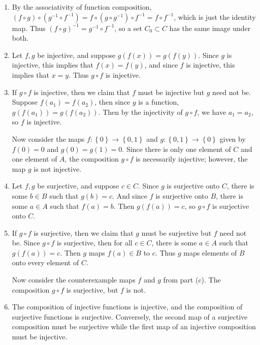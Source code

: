 \documentclass[11pt]{article}
\begin{document}
\begin{enumerate}
	\item By the associativity of function composition, $(f \circ g) \circ (g^{-1} \circ f^{-1}) = f \circ (g \circ g^{-1}) \circ f^{-1} = f \circ f^{-1}$, which is just the identity map. Thus $(f\circ g)^{-1} = g^{-1} \circ f^{-1}$, so a set $C_0 \subset C$ has the same image under both.
	
	\item Let $f,g$ be injective, and suppose $g(f(x)) = g(f(y))$. Since $g$ is injective, this implies that $f(x)=f(y)$, and since $f$ is injective, this implies that $x=y$. Thus $g \circ f$ is injective.

	\item If $g \circ f$ is injective, then we claim that $f$ must be injective but $g$ need not be. Suppose $f(a_1)=f(a_2)$, then since $g$ is a function, $g(f(a_1))=g(f(a_2))$. Then by the injectivity of $g \circ f$, we have $a_1=a_2$, so $f$ is injective.

		Now consider the maps $f:\left\{ 0 \right\}\to \left\{ 0,1 \right\}$ and $g:\left\{ 0,1 \right\}\to \left\{ 0 \right\}$ given by $f(0)=0$ and $g(0)=g(1)=0$. Since there is only one element of $C$ and one element of $A$, the composition $g \circ f$ is necessarily injective; however, the map $g$ is not injective.
	
	\item Let $f,g$ be surjective, and suppose $c \in C$. Since $g$ is surjective onto $C$, there is some $b \in B$ such that $g(b) = c$. And since $f$ is surjective onto $B$, there is some $a \in A$ such that $f(a) = b$. Then $g(f(a)) = c$, so $g \circ f$ is surjective onto $C$.

	\item If $g \circ f$ is surjective, then we claim that $g$ must be surjective but $f$ need not be. Since $g \circ f$ is surjective, then for all $c \in C$, there is some $a\in A$ such that $g(f(a)) = c$. Then $g$ maps $f(a) \in B$ to $c$. Thus $g$ maps elements of $B$ onto every element of $C$.

		Now consider the counterexample maps $f$ and $g$ from part (c). The composition $g \circ f$ is surjective, but $f$ is not.
	
	\item The composition of injective functions is injective, and the composition of surjective functions is surjective. Conversely, the second map of a surjective composition must be surjective while the first map of an injective composition must be injective.
\end{enumerate}
\end{document}
